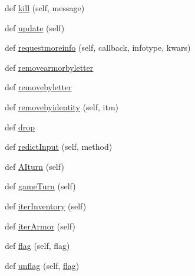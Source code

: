 \begin{DoxyCompactItemize}
def \hyperlink{classplayer__input_1_1_player_object_aa78048d727b94561070090562e0b6989}{kill} (self, message)
\item 
def \hyperlink{classplayer__input_1_1_player_object_aa9e35918088b9264cd87786874a37d50}{update} (self)
\item 
def \hyperlink{classplayer__input_1_1_player_object_ad3afc9d7ed9ce3f7724b320a6c23a85c}{requestmoreinfo} (self, callback, infotype, kwars)
\item 
def \hyperlink{classplayer__input_1_1_player_object_aa4ffa7036a3b8539dd281e4bb10b1843}{removearmorbyletter}
\item 
def \hyperlink{classplayer__input_1_1_player_object_a94fac9dd2160e8a6d96b168ba712ad56}{removebyletter}
\item 
def \hyperlink{classplayer__input_1_1_player_object_a6bf34f95c0748bcd52009dd678e41a09}{removebyidentity} (self, itm)
\item 
def \hyperlink{classplayer__input_1_1_player_object_ae4ff9e1e12a38dc90816b6380f9ae675}{drop}
\item 
def \hyperlink{classplayer__input_1_1_player_object_a824b3e8bc09b650f0b27e828cb64e38f}{redict\+Input} (self, method)
\item 
def \hyperlink{classplayer__input_1_1_player_object_a250cfcfdfe86a6eea099611fc6f0097a}{A\+Iturn} (self)
\item 
def \hyperlink{classplayer__input_1_1_player_object_adbd3a1be0314bd02cb7f1358457c3c46}{game\+Turn} (self)
\item 
def \hyperlink{classplayer__input_1_1_player_object_abdd1804f5bf6020b43498019aae9f232}{iter\+Inventory} (self)
\item 
def \hyperlink{classplayer__input_1_1_player_object_a530c17a6be67e1cd08ab344a303a9ab6}{iter\+Armor} (self)
\item 
def \hyperlink{classplayer__input_1_1_player_object_a889349314d40da36aa486eb0fa47c4e8}{flag} (self, flag)
\item 
def \hyperlink{classplayer__input_1_1_player_object_ab6a1514afa043f280109456559f64e55}{unflag} (self, \hyperlink{classplayer__input_1_1_player_object_a889349314d40da36aa486eb0fa47c4e8}{flag})
\end{DoxyCompactItemize}
